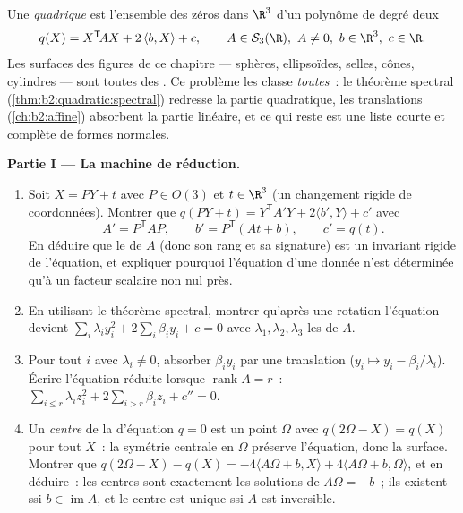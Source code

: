 \begin{problem}\label{pb:b2:surfaces:1}
Une \emph{quadrique} est l'ensemble des zéros dans $\R^3$ d'un
polynôme de degré deux
\[
q(X) = X^{\mathsf T}\!AX + 2\,\langle b, X\rangle + c,
\qquad A \in \mathcal S_3(\R),\ A \neq 0,\ b \in \R^3,\
c \in \R .
\]
Les surfaces des figures de ce chapitre --- sphères,
ellipsoïdes, selles, cônes, cylindres --- sont toutes des
. Ce problème les classe \emph{toutes}~: le théorème
spectral (\cref{thm:b2:quadratic:spectral}) redresse la partie
quadratique, les translations  (\cref{ch:b2:affine})
absorbent la partie linéaire, et ce qui reste est une liste
courte et complète de formes normales.

\medskip
\noindent\textbf{Partie I --- La machine de réduction.}
\begin{enumerate}
  \item Soit $X = PY + t$ avec $P \in O(3)$ et $t \in \R^3$ (un
        changement rigide de coordonnées). Montrer que $q(PY + t) =
        Y^{\mathsf T}\!A'Y + 2\langle b', Y\rangle + c'$ avec
        \[
        A' = P^{\mathsf T}\!AP, \qquad
        b' = P^{\mathsf T}(At + b), \qquad
        c' = q(t) .
        \]
        En déduire que le  de $A$ (donc son rang et sa
        signature) est un invariant rigide de l'équation, et
        expliquer pourquoi l'équation d'une  donnée n'est
        déterminée qu'à un facteur scalaire non nul près.
  \item En utilisant le théorème spectral, montrer qu'après une rotation
        l'équation devient $\sum_i \lambda_i y_i^2 +
        2\sum_i\beta_iy_i + c = 0$ avec $\lambda_1, \lambda_2,
        \lambda_3$ les  de $A$.
  \item Pour tout $i$ avec $\lambda_i \neq 0$, absorber
        $\beta_iy_i$ par une translation ($y_i \mapsto y_i -
        \beta_i/\lambda_i$). Écrire l'équation réduite lorsque
        $\operatorname{rank} A = r$~: $\sum_{i\leq r}\lambda_i
        z_i^2 + 2\sum_{i > r}\beta_iz_i + c'' = 0$.
  \item Un \emph{centre} de la  d'équation $q = 0$ est
        un point $\Omega$ avec $q(2\Omega - X) = q(X)$ pour tout
        $X$~: la symétrie centrale en $\Omega$ préserve
        l'équation, donc la surface. Montrer que $q(2\Omega - X)
        - q(X) = -4\langle A\Omega + b, X\rangle + 4\langle
        A\Omega + b, \Omega\rangle$, et en déduire~: les centres
        sont exactement les solutions de $A\Omega = -b$~; ils
        existent ssi $b \in \operatorname{im}A$, et le centre
        est unique ssi $A$ est inversible.
\end{enumerate}


\end{problem}

